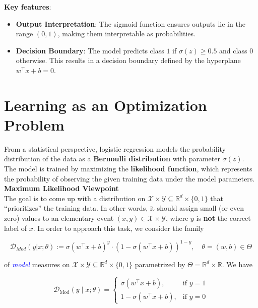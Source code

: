 \textbf{Key features}:
\begin{itemize}
    \item \textbf{Output Interpretation}: The sigmoid function ensures outputs lie in the range $(0, 1)$, making them interpretable as probabilities.
    \item \textbf{Decision Boundary}: The model predicts class $1$ if $\sigma(z) \geq 0.5$ and class $0$ otherwise. This results in a decision boundary defined by the hyperplane $w^\top x + b = 0$.\cite{hastie2009elements}
\end{itemize}

\section{Learning as an Optimization Problem}
From a statistical perspective, logistic regression models the probability distribution of the data as a \textbf{Bernoulli distribution} with parameter $\sigma(z)$. The model is trained by maximizing the \textbf{likelihood function}, which represents the probability of observing the given training data under the model parameters.\\

\textbf{Maximum Likelihood Viewpoint}\\

The goal is to come up with a distribution on $\mathcal{X} \times \mathcal{Y} \subseteq \mathbb{R}^d \times \{0,1\}$ that “prioritizes” the training data. In other words, it should assign small (or even zero) values to an elementary event $(x, y) \in \mathcal{X} \times \mathcal{Y}$, where $y$ is \textbf{not} the correct label of $x$. In
order to approach this task, we consider the family

\begin{equation}
    \mathcal{D}_{Mod}(y|x;\theta) := \sigma(w^\top x +b)^y \cdot (1 - \sigma(w^\top x +b))^{1-y}, \quad \theta = (w, b) \in \Theta
    \label{eqn:2}
\end{equation}

of \textcolor{blue}{\emph{model}} measures on $\mathcal{X} \times \mathcal{Y} \subseteq \mathbb{R}^d \times \{0,1\}$ parametrized by $\Theta= \mathbb{R}^d \times \mathbb{R}$. We have

\begin{equation}
    \mathcal{D}_{\text{Mod}}(y \mid x; \theta) =
    \begin{cases} 
        \sigma(w^\top x + b), & \text{if } y = 1 \\
        1 - \sigma(w^\top x + b), & \text{if } y = 0
    \end{cases}
    \label{eqn:3}
\end{equation}


